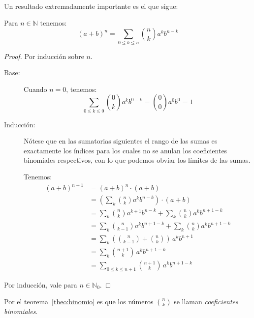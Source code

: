   Un resultado extremadamente importante
  es el que sigue:
  \begin{theorem}[Binomio]
    \label{theo:binomio}
    Para \(n \in \mathbb{N}\) tenemos:
    \begin{equation*}
      (a + b)^n
	= \sum_{0 \le k \le n} \binom{n}{k} a^k b^{n - k}
    \end{equation*}
  \end{theorem}
  \begin{proof}
    Por inducción sobre \(n\).%
    \begin{description}
    \item[Base:]
      Cuando \(n = 0\),
      tenemos:
      \begin{equation*}
	\sum_{0 \le k \le 0}
	  \binom{0}{k} a^k b^{0 - k}
	  = \binom{0}{0} a^0 b^0
	  = 1
      \end{equation*}
    \item[Inducción:]
      Nótese que en las sumatorias siguientes
      el rango de las sumas
      es exactamente los índices
      para los cuales
      no se anulan los coeficientes binomiales respectivos,
      con lo que podemos obviar los límites de las sumas.

      Tenemos:
      \begin{align*}
	(a + b)^{n + 1}
	  &= (a + b)^n \cdot (a + b) \\
	  &= \left(\sum_k \binom{n}{k} a^k b^{n - k}\right)
	       \cdot (a + b) \\
	  &= \sum_k \binom{n}{k} a^{k + 1} b^{n - k}
	       + \sum_k \binom{n}{k} a^k b^{n + 1 - k} \\
	  &= \sum_k \binom{n}{k - 1} a^k b^{n + 1 - k}
	       + \sum_k \binom{n}{k} a^k b^{n + 1 - k} \\
	  &= \sum_k
	       \left(
		 \binom{n}{k - 1}
		   + \binom{n}{k}
	       \right) \, a^k b^{n + 1} \\
	  &= \sum_k \binom{n + 1}{k} \, a^k b^{n + 1 - k} \\
	  &= \sum_{0 \le k \le n + 1}
	       \binom{n + 1}{k} \, a^k b^{n + 1 - k}
      \end{align*}
    \end{description}
    Por inducción,
    vale para \(n \in \mathbb{N}_0\).
  \end{proof}
  Por el teorema~\ref{theo:binomio}
  es que los números \(\binom{n}{k}\)
  se llaman \emph{coeficientes binomiales}.%

